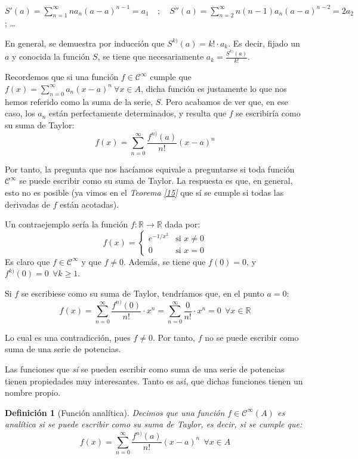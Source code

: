 \documentclass[11pt, a4paper]{article}
\theoremstyle{theorem-style}
\theoremstyle{definition-style}
\newtheorem{ndef}{Definición}[section]
\theoremstyle{remark-style}
\theoremstyle{example-style}
\begin{document}
$\displaystyle S'(a) = \sum_{n=1}^{\infty} na_n(a-a)^{n-1} = a_1 \quad ; \quad S''(a) = \sum_{n=2}^{\infty} n(n-1)a_n(a-a)^{n-2} = 2a_2$ \quad ; \quad \dots

En general, se demuestra por inducción que $S^{k)} (a) = k! \cdot a_k$. Es decir, fijado un $a$ y conocida la función $S$, se tiene que necesariamente $a_k = \frac{S^{k)}(a)}{k!}$.

Recordemos que si una función $f \in \mathcal{C}^{\infty}$ cumple que $f(x) = \sum_{n=0}^{\infty} a_n(x-a)^n\ \forall x \in A$, dicha función es justamente lo que nos hemos referido como la suma de la serie, $S$. Pero acabamos de ver que, en ese caso, los $a_n$ están perfectamente determinados, y resulta que $f$ se escribiría como su suma de Taylor: $$f(x) = \sum_{n=0}^{\infty} \frac{f^{n)}(a)}{n!} (x-a)^n$$

Por tanto, la pregunta que nos hacíamos equivale a preguntarse si toda función $\mathcal{C}^{\infty}$ se puede escribir como su suma de Taylor. La respuesta es que, en general, esto no es posible (ya vimos en el \textit{Teorema \ref{15}} que sí se cumple si todas las derivadas de $f$ están acotadas).

Un contraejemplo sería la función $f: \mathbb{R} \longrightarrow \mathbb{R}$ dada por: $$f(x) = \begin{cases}
  e^{-1/x^2} & \text{si } x\ne 0\\
  0 & \text{si } x=0
\end{cases}$$ Es claro que $f \in \mathcal{C}^{\infty}$ y que $f \ne 0$. Además, se tiene que $f(0) = 0$, y $f^{k)}(0) = 0\ \ \forall k \ge 1$. 

Si $f$ se escribiese como su suma de Taylor, tendríamos que, en el punto $a=0$: $$f(x) = \sum_{n=0}^{\infty} \frac{f^{n)}(0)}{n!} \cdot x^n =  \sum_{n=0}^{\infty} \frac{0}{n!}\cdot x^n = 0\ \ \forall x \in \mathbb{R}$$

Lo cual es una contradicción, pues $f\ne 0$. Por tanto, $f$ no se puede escribir como suma de una serie de potencias.

Las funciones que \textit{sí} se pueden escribir como suma de una serie de potencias tienen propiedades muy interesantes. Tanto es así, que dichas funciones tienen un nombre propio.

\begin{ndef}[Función analítica] Decimos que una función $f \in \mathcal{C}^{\infty}(A)$ es analítica si se puede escribir como su suma de Taylor, es decir, si se cumple que: $$f(x) = \sum_{n=0}^{\infty} \frac{f^{n)}(a)}{n!}(x-a)^n\ \ \forall x \in A$$
\end{ndef}
\end{document}
